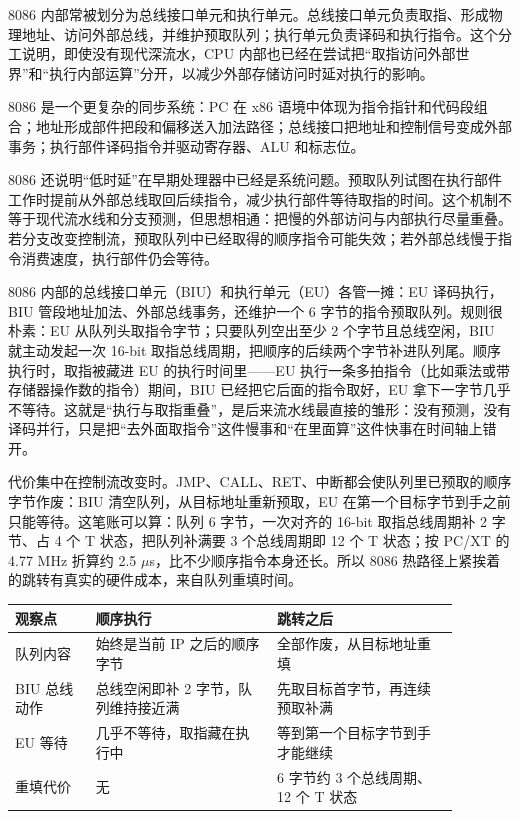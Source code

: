 
8086 内部常被划分为总线接口单元和执行单元。总线接口单元负责取指、形成物理地址、访问外部总线，并维护预取队列；执行单元负责译码和执行指令。这个分工说明，即使没有现代深流水，CPU 内部也已经在尝试把“取指访问外部世界”和“执行内部运算”分开，以减少外部存储访问时延对执行的影响。

8086 是一个更复杂的同步系统：PC 在 x86 语境中体现为指令指针和代码段组合；地址形成部件把段和偏移送入加法路径；总线接口把地址和控制信号变成外部事务；执行部件译码指令并驱动寄存器、ALU 和标志位。

8086 还说明“低时延”在早期处理器中已经是系统问题。预取队列试图在执行部件工作时提前从外部总线取回后续指令，减少执行部件等待取指的时间。这个机制不等于现代流水线和分支预测，但思想相通：把慢的外部访问与内部执行尽量重叠。若分支改变控制流，预取队列中已经取得的顺序指令可能失效；若外部总线慢于指令消费速度，执行部件仍会等待。

8086 内部的总线接口单元（BIU）和执行单元（EU）各管一摊：EU 译码执行，BIU 管段地址加法、外部总线事务，还维护一个 6 字节的指令预取队列。规则很朴素：EU 从队列头取指令字节；只要队列空出至少 2 个字节且总线空闲，BIU 就主动发起一次 16-bit 取指总线周期，把顺序的后续两个字节补进队列尾。顺序执行时，取指被藏进 EU 的执行时间里——EU 执行一条多拍指令（比如乘法或带存储器操作数的指令）期间，BIU 已经把它后面的指令取好，EU 拿下一字节几乎不等待。这就是“执行与取指重叠”，是后来流水线最直接的雏形：没有预测，没有译码并行，只是把“去外面取指令”这件慢事和“在里面算”这件快事在时间轴上错开。

代价集中在控制流改变时。JMP、CALL、RET、中断都会使队列里已预取的顺序字节作废：BIU 清空队列，从目标地址重新预取，EU 在第一个目标字节到手之前只能等待。这笔账可以算：队列 6 字节，一次对齐的 16-bit 取指总线周期补 2 字节、占 4 个 T 状态，把队列补满要 3 个总线周期即 12 个 T 状态；按 PC/XT 的 4.77 MHz 折算约 2.5 $\mu$s，比不少顺序指令本身还长。所以 8086 热路径上紧挨着的跳转有真实的硬件成本，来自队列重填时间。

\begin{longtable}{L{0.16\linewidth}L{0.36\linewidth}L{0.36\linewidth}}
\toprule
观察点 & 顺序执行 & 跳转之后 \\
\midrule
队列内容 & 始终是当前 IP 之后的顺序字节 & 全部作废，从目标地址重填 \\
BIU 总线动作 & 总线空闲即补 2 字节，队列维持接近满 & 先取目标首字节，再连续预取补满 \\
EU 等待 & 几乎不等待，取指藏在执行中 & 等到第一个目标字节到手才能继续 \\
重填代价 & 无 & 6 字节约 3 个总线周期、12 个 T 状态 \\
\bottomrule
\end{longtable}

